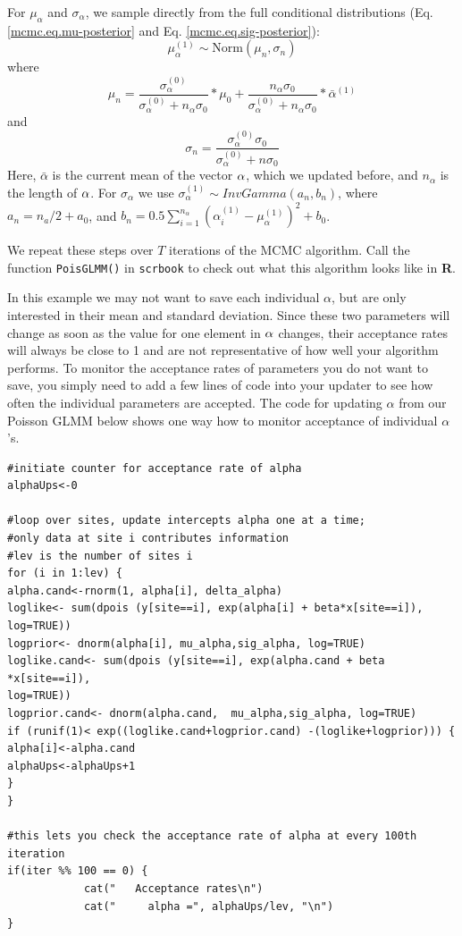 For $\mu_{\alpha}$ and $\sigma_{\alpha}$, we sample directly from the full conditional distributions (Eq. \ref{mcmc.eq.mu-posterior}  and Eq. \ref{mcmc.eq.sig-posterior}):
\[
\mu_{\alpha}^{(1)} \sim \mbox{Norm} (\mu_n, \sigma_n)
\]
where 
\[\mu_n =  \frac{\sigma_{\alpha}^{(0)}}  {\sigma_{\alpha}^{(0)}   +n_{\alpha}    \sigma_0} *  \mu_0 +  \frac{n_{\alpha}  \sigma_0} {\sigma_{\alpha}^{(0)}   +n_{\alpha} \sigma_0} *\bar{\alpha}^{(1)}
\]
and 
\[
\sigma_n= \frac{\sigma_{\alpha}^{(0)}   \sigma_0 } {\sigma_{\alpha}^{(0)}  + n \sigma_0}
\]
Here, $\bar{\alpha}$ is the current mean of the vector ${\bf\alpha}$, which we
updated before, and $n_{\alpha}$ is the length of ${\bf\alpha}$. 
For $\sigma_{\alpha}$ we use $\sigma_{\alpha}^{(1)}\sim InvGamma (a_n, b_n)$,
where  $a_n = n_a/2   + a_0$, and $b_n = 0.5  \displaystyle\sum\limits_{i=1}^{n_{\alpha}} (\alpha_i^{(1)}-\mu_{\alpha}^{(1)})^2+ b_0$.


We repeat these steps over $T$ iterations of the MCMC algorithm. Call
the function \mbox{\tt PoisGLMM()} in \mbox{\tt scrbook} to check out
what this algorithm looks like in {\bf R}.

In this example we may not want to save each individual $\alpha$, but
are only interested in their mean and standard deviation. Since these
two parameters will change as soon as the value for one element in
$\bf{\alpha}$ changes, their acceptance rates will always be close to
1 and are not representative of how well your algorithm performs. To
monitor the acceptance rates of parameters you do not want to save,
you simply need to add a few lines of code into your updater to see
how often the individual parameters are accepted. The code for
updating $\alpha$ from our Poisson GLMM below shows one way how to
monitor acceptance of individual $\alpha$'s.

{\small
\begin{verbatim}
#initiate counter for acceptance rate of alpha
alphaUps<-0

#loop over sites, update intercepts alpha one at a time; 
#only data at site i contributes information			
#lev is the number of sites i
for (i in 1:lev) { 		
alpha.cand<-rnorm(1, alpha[i], delta_alpha)	
loglike<- sum(dpois (y[site==i], exp(alpha[i] + beta*x[site==i]), log=TRUE))  
logprior<- dnorm(alpha[i], mu_alpha,sig_alpha, log=TRUE)
loglike.cand<- sum(dpois (y[site==i], exp(alpha.cand + beta *x[site==i]), 
log=TRUE))
logprior.cand<- dnorm(alpha.cand,  mu_alpha,sig_alpha, log=TRUE)
if (runif(1)< exp((loglike.cand+logprior.cand) -(loglike+logprior))) {
alpha[i]<-alpha.cand
alphaUps<-alphaUps+1
}
}

#this lets you check the acceptance rate of alpha at every 100th iteration
if(iter %% 100 == 0) {  
            cat("   Acceptance rates\n")
            cat("     alpha =", alphaUps/lev, "\n")
}
\end{verbatim}
}

